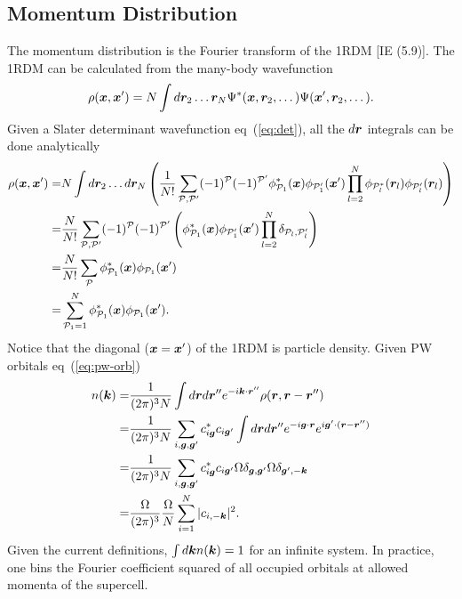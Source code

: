 \subsection{Momentum Distribution}

The momentum distribution is the Fourier transform of the 1RDM [IE (5.9)]. The 1RDM can be calculated from the many-body wavefunction
\begin{align}
\rho(\boldsymbol{x}, \boldsymbol{x}') = N\int d\boldsymbol{r}_2\dots\boldsymbol{r}_N \Psi^*(\boldsymbol{x}, \boldsymbol{r}_2, \dots) \Psi(\boldsymbol{x}', \boldsymbol{r}_2, \dots).
\end{align}
Given a Slater determinant wavefunction eq~(\ref{eq:det}), all the $d\boldsymbol{r}$ integrals can be done analytically
\begin{align}
\rho(\boldsymbol{x}, \boldsymbol{x}') =& N\int d\boldsymbol{r}_2\dots d\boldsymbol{r}_N
\left(
\frac{1}{N!}\sum\limits_{\mathcal{P}, \mathcal{P}'} (-1)^{\mathcal{P}} (-1)^{\mathcal{P}'}
\phi_{\mathcal{P}_1}^*(\boldsymbol{x})\phi_{\mathcal{P}_1'}(\boldsymbol{x}')
\prod\limits_{l=2}^{N}\phi_{\mathcal{P}_l^*}(\boldsymbol{r}_l)\phi_{\mathcal{P}_l'}(\boldsymbol{r}_l) 
\right) \nonumber \\
=& \frac{N}{N!} \sum\limits_{\mathcal{P}, \mathcal{P}'} (-1)^{\mathcal{P}} (-1)^{\mathcal{P}'}
\left(
\phi_{\mathcal{P}_1}^*(\boldsymbol{x})\phi_{\mathcal{P}_1'}(\boldsymbol{x}')
\prod\limits_{l=2}^N \delta_{\mathcal{P}_l,\mathcal{P}_l'}
\right) \nonumber \\
=& \frac{N}{N!} \sum\limits_{\mathcal{P}} \phi_{\mathcal{P}_1}^*(\boldsymbol{x})\phi_{\mathcal{P}_1}(\boldsymbol{x}') \nonumber \\
=& \sum\limits_{\mathcal{P}_1=1}^N \phi_{\mathcal{P}_1}^*(\boldsymbol{x})\phi_{\mathcal{P}_1}(\boldsymbol{x}'). \label{eq:det-1rdm}
\end{align}
Notice that the diagonal ($\boldsymbol{x}=\boldsymbol{x}'$) of the 1RDM is particle density. Given PW orbitals eq~(\ref{eq:pw-orb})
\begin{align}
n(\boldsymbol{k}) =& \frac{1}{(2\pi)^3N}\int d\boldsymbol{r} d\boldsymbol{r}'' e^{-i\boldsymbol{k}\cdot\boldsymbol{r}''} \rho(\boldsymbol{r}, \boldsymbol{r}-\boldsymbol{r}'') \nonumber \\
= & \frac{1}{(2\pi)^3N} \sum\limits_{i, \boldsymbol{g}, \boldsymbol{g}'} c_{i\boldsymbol{g}}^*c_{i\boldsymbol{g}'}
\int d\boldsymbol{r} d\boldsymbol{r}'' e^{-i\boldsymbol{g}\cdot\boldsymbol{r}}e^{i\boldsymbol{g}'\cdot(\boldsymbol{r}-\boldsymbol{r}'')} \nonumber \\
=&  \frac{1}{(2\pi)^3N} \sum\limits_{i, \boldsymbol{g}, \boldsymbol{g}'} c_{i\boldsymbol{g}}^*c_{i\boldsymbol{g}'} \Omega\delta_{\boldsymbol{g}, \boldsymbol{g}'}\Omega\delta_{\boldsymbol{g}',-\boldsymbol{k}} \nonumber \\
=& \frac{\Omega}{(2\pi)^3}\frac{\Omega}{N}\sum_{i=1}^{N} \vert c_{i,-\boldsymbol{k}}\vert^2.\label{eq:det-nofk}
\end{align}
Given the current definitions, $\int d\boldsymbol{k} n(\boldsymbol{k}) = 1$ for an infinite system. In practice, one bins the Fourier coefficient squared of all occupied orbitals at allowed momenta of the supercell.

